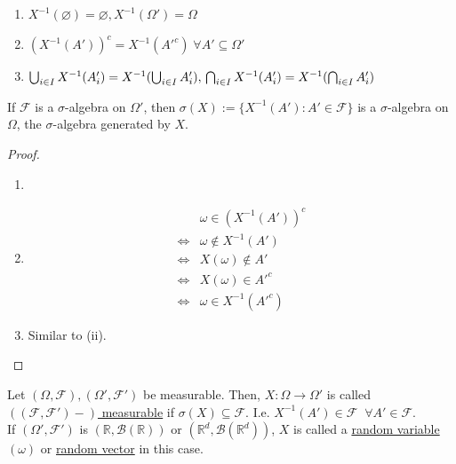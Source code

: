 \documentclass{article}
\newcommand{\R}{\mathbb{R}}
\begin{document}
	\begin{mylem}{}{}
		\begin{enumerate}[label=(\roman*)]
			\item $X^{-1}(\varnothing)=\varnothing, X^{-1}(\Omega')=\Omega$
			\item $(X^{-1}(A'))^c=X^{-1}(A'^c)\;\forall A'\subseteq\Omega'$
			\item
			$\bigcup_{i\in I}X^{-1}(A_i')=X^{-1}(\bigcup_{i\in I}A_i'),\\
			\bigcap_{i\in I}X^{-1}(A_i')=X^{-1}(\bigcap_{i\in I}A_i')$
		\end{enumerate}
		
		If $\mathcal{F}$ is a $\sigma$-algebra on $\Omega'$, then $\sigma(X):=\{X^{-1}(A') : A'\in\mathcal{F}\}$ is a $\sigma$-algebra on $\Omega$, the $\sigma$-algebra generated by $X$.
		
		\begin{proof}~
			\begin{enumerate}[label=(\roman*)]
				\item ~
				\item
				\begin{align*}
					&\omega\in(X^{-1}(A'))^c\\
					\Leftrightarrow&\omega\notin X^{-1}(A')\\
					\Leftrightarrow&X(\omega)\notin A'\\
					\Leftrightarrow&X(\omega)\in A'^c\\
					\Leftrightarrow&\omega\in X^{-1}(A'^c)
				\end{align*}
				\item Similar to (ii).
			\end{enumerate}
		\end{proof}
	\end{mylem}
	
	\begin{mydef}{}{}
		Let $(\Omega, \mathcal{F}), (\Omega', \mathcal{F}')$ be measurable. Then, $X : \Omega\to\Omega'$ is called \underline{$((\mathcal{F}, \mathcal{F}')-)$ measurable} if $\sigma(X)\subseteq\mathcal{F}$. I.e. $X^{-1}(A')\in\mathcal{F}\;\;\forall A'\in\mathcal{F}$.\\
		
		If $(\Omega', \mathcal{F}')$ is $(\R, \mathcal{B}(\R))$ or $(\R^d, \mathcal{B}(\R^d))$, $X$ is called a \underline{random variable} $(\omega)$ or \underline{random vector} in this case.
	\end{mydef}
	\newpage
	
\end{document}
